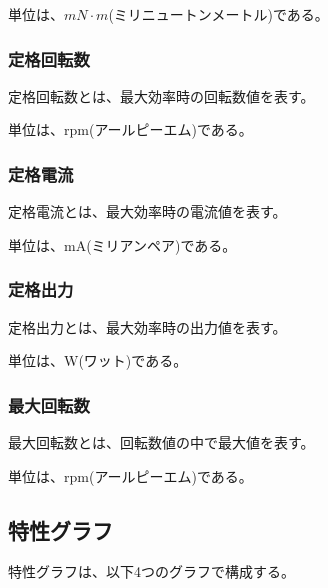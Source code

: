 単位は、$mN \cdot m$(ミリニュートンメートル)である。
\subsubsection{定格回転数}\label{sub:sub:teikakukaiten}
定格回転数とは、最大効率時の回転数値を表す。

単位は、rpm(アールピーエム)である。

\subsubsection{定格電流}\label{sub:sub:teikakuden}
定格電流とは、最大効率時の電流値を表す。

単位は、mA(ミリアンペア)である。
\subsubsection{定格出力}\label{sub:sub:teikakusyutu}
定格出力とは、最大効率時の出力値を表す。

単位は、W(ワット)である。
\subsubsection{最大回転数}\label{sub:sub:saidaikai}
最大回転数とは、回転数値の中で最大値を表す。

単位は、rpm(アールピーエム)である。
\subsection{特性グラフ}\label{sub:tokuseigurahu}
特性グラフは、以下4つのグラフで構成する。
